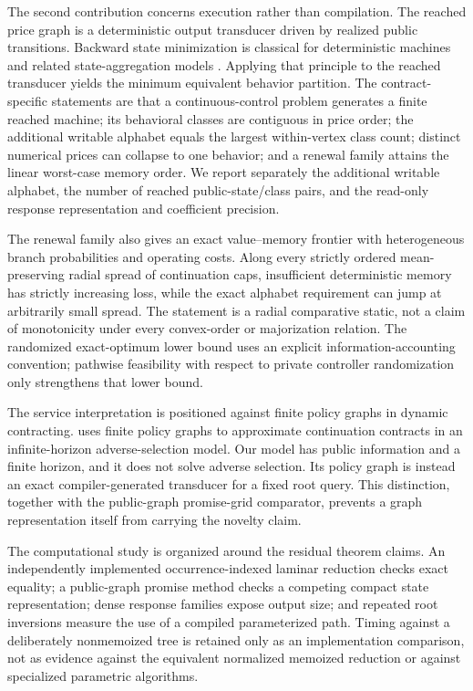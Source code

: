 The second contribution concerns execution rather than compilation. The reached price graph is a deterministic output transducer driven by realized public transitions. Backward state minimization is classical for deterministic machines and related state-aggregation models \citep{BeanBirgeSmith1987,GivanDeanGreig2003,Peyriere2023}. Applying that principle to the reached transducer yields the minimum equivalent behavior partition. The contract-specific statements are that a continuous-control problem generates a finite reached machine; its behavioral classes are contiguous in price order; the additional writable alphabet equals the largest within-vertex class count; distinct numerical prices can collapse to one behavior; and a renewal family attains the linear worst-case memory order. We report separately the additional writable alphabet, the number of reached public-state/class pairs, and the read-only response representation and coefficient precision.

The renewal family also gives an exact value--memory frontier with heterogeneous branch probabilities and operating costs. Along every strictly ordered mean-preserving radial spread of continuation caps, insufficient deterministic memory has strictly increasing loss, while the exact alphabet requirement can jump at arbitrarily small spread. The statement is a radial comparative static, not a claim of monotonicity under every convex-order or majorization relation. The randomized exact-optimum lower bound uses an explicit information-accounting convention; pathwise feasibility with respect to private controller randomization only strengthens that lower bound.

The service interpretation is positioned against finite policy graphs in dynamic contracting. \citet{Zhang2012} uses finite policy graphs to approximate continuation contracts in an infinite-horizon adverse-selection model. Our model has public information and a finite horizon, and it does not solve adverse selection. Its policy graph is instead an exact compiler-generated transducer for a fixed root query. This distinction, together with the public-graph promise-grid comparator, prevents a graph representation itself from carrying the novelty claim.

The computational study is organized around the residual theorem claims. An independently implemented occurrence-indexed laminar reduction checks exact equality; a public-graph promise method checks a competing compact state representation; dense response families expose output size; and repeated root inversions measure the use of a compiled parameterized path. Timing against a deliberately nonmemoized tree is retained only as an implementation comparison, not as evidence against the equivalent normalized memoized reduction or against specialized parametric algorithms.


